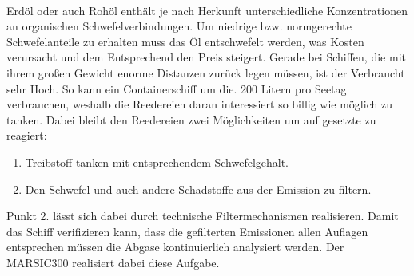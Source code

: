 \\
Erdöl oder auch Rohöl enthält je nach Herkunft unterschiedliche Konzentrationen an organischen Schwefelverbindungen. Um niedrige bzw. normgerechte Schwefelanteile zu erhalten muss das Öl entschwefelt werden, was Kosten verursacht und dem Entsprechend den Preis steigert. Gerade bei Schiffen, die mit ihrem großen Gewicht enorme Distanzen zurück legen müssen, ist der Verbraucht sehr Hoch. So kann ein Containerschiff um die. 200 Litern pro Seetag verbrauchen, weshalb die Reedereien daran interessiert so billig wie möglich zu tanken. Dabei bleibt den Reedereien zwei Möglichkeiten um auf gesetzte zu reagiert:
\begin{enumerate}
\item Treibstoff tanken mit entsprechendem Schwefelgehalt.
\item Den Schwefel und auch andere Schadstoffe aus der Emission zu filtern.
\end{enumerate}
Punkt 2. lässt sich dabei durch technische Filtermechanismen realisieren. Damit das Schiff verifizieren kann, dass die gefilterten Emissionen allen Auflagen entsprechen müssen die Abgase kontinuierlich analysiert werden. Der MARSIC300 realisiert dabei diese Aufgabe.        


